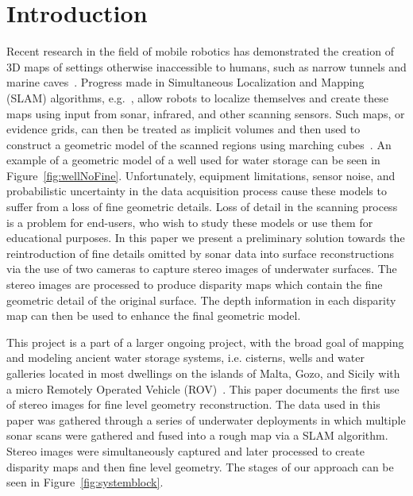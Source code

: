 \documentclass{llncs}
\begin{document}
\section{Introduction}
\noindent Recent research in the field of mobile robotics has demonstrated the creation of 3D maps of settings otherwise inaccessible to humans, such as narrow tunnels and marine caves~\cite{ICEX11,McVicker}. Progress made in Simultaneous Localization and Mapping (SLAM) algorithms, e.g.~\cite{Williams2000,harbor,Fairfield2006}, allow robots to localize themselves and create these maps using input from sonar, infrared, and other scanning sensors. Such maps, or evidence grids, can then be treated as implicit volumes and then used to construct a geometric model of the scanned regions using marching cubes~\cite{Lorensen}. An example of a geometric model of a well used for water storage can be seen in Figure~\ref{fig:wellNoFine}. Unfortunately, equipment limitations, sensor noise, and probabilistic uncertainty in the data acquisition process cause these models to suffer from a loss of fine geometric details. Loss of detail in the scanning process is a problem for end-users, who wish to study these models or use them for educational purposes. In this paper we present a preliminary solution towards the reintroduction of fine details omitted by sonar data into surface reconstructions via the use of two cameras to capture stereo images of underwater surfaces.  The stereo images are processed to produce disparity maps which contain the fine geometric detail of the original surface. The depth information in each disparity map can then be used to enhance the final geometric model.

This project is a part of a larger ongoing project, with the broad goal of mapping and modeling ancient water storage systems, i.e. cisterns, wells and water galleries located in most dwellings on the islands of Malta, Gozo, and Sicily with a micro Remotely Operated Vehicle (ROV)~\cite{White10,ICEX11,McVicker}.  This paper documents the first use of stereo images for fine level geometry reconstruction. The data used in this paper was gathered through a series of underwater deployments in which multiple sonar scans were gathered and fused into a rough map via a SLAM algorithm.  Stereo images were simultaneously captured and later processed to create disparity maps and then fine level geometry. 
The stages of our approach can be seen in Figure~\ref{fig:systemblock}.
\end{document}
